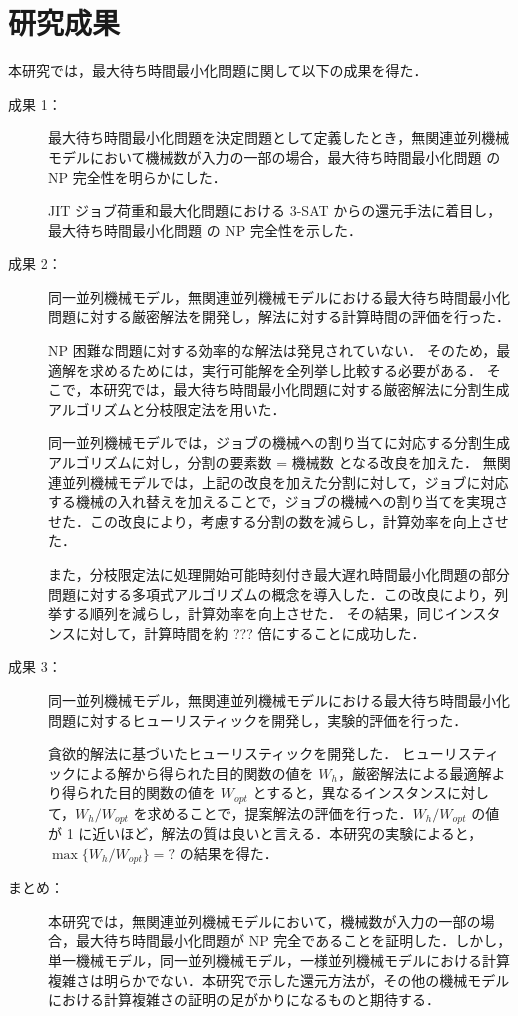 \documentclass[12pt]{optlab-bachelor}
\begin{document}
\section{研究成果}
本研究では，最大待ち時間最小化問題に関して以下の成果を得た．
\begin{description}
  \item[成果 1：]
  最大待ち時間最小化問題を決定問題として定義したとき，無関連並列機械モデルにおいて機械数が入力の一部の場合，最大待ち時間最小化問題 の NP 完全性を明らかにした．

  JIT ジョブ荷重和最大化問題における \textsc{3-SAT} からの還元手法に着目し，最大待ち時間最小化問題 の NP 完全性を示した．

  \item[成果 2：]
  同一並列機械モデル，無関連並列機械モデルにおける最大待ち時間最小化問題に対する厳密解法を開発し，解法に対する計算時間の評価を行った．

  NP 困難な問題に対する効率的な解法は発見されていない．
  そのため，最適解を求めるためには，実行可能解を全列挙し比較する必要がある．
  そこで，本研究では，最大待ち時間最小化問題に対する厳密解法に分割生成アルゴリズムと分枝限定法を用いた．

  同一並列機械モデルでは，ジョブの機械への割り当てに対応する分割生成アルゴリズムに対し，分割の要素数 = 機械数 となる改良を加えた．
  無関連並列機械モデルでは，上記の改良を加えた分割に対して，ジョブに対応する機械の入れ替えを加えることで，ジョブの機械への割り当てを実現させた．この改良により，考慮する分割の数を減らし，計算効率を向上させた．

  また，分枝限定法に処理開始可能時刻付き最大遅れ時間最小化問題の部分問題に対する多項式アルゴリズムの概念を導入した．この改良により，列挙する順列を減らし，計算効率を向上させた．
  その結果，同じインスタンスに対して，計算時間を約 ??? 倍にすることに成功した．

  \item[成果 3：]
  同一並列機械モデル，無関連並列機械モデルにおける最大待ち時間最小化問題に対するヒューリスティックを開発し，実験的評価を行った．

  貪欲的解法に基づいたヒューリスティックを開発した．
  ヒューリスティックによる解から得られた目的関数の値を $W_h$，厳密解法による最適解より得られた目的関数の値を $W_{opt}$ とすると，異なるインスタンスに対して，$W_h/W_{opt}$ を求めることで，提案解法の評価を行った．$W_h/W_{opt}$ の値が 1 に近いほど，解法の質は良いと言える．本研究の実験によると，$\max\big\{W_h/W_{opt}\big\} = ?$ の結果を得た．

  \item[まとめ：] 本研究では，無関連並列機械モデルにおいて，機械数が入力の一部の場合，最大待ち時間最小化問題が NP 完全であることを証明した．しかし，単一機械モデル，同一並列機械モデル，一様並列機械モデルにおける計算複雑さは明らかでない．本研究で示した還元方法が，その他の機械モデルにおける計算複雑さの証明の足がかりになるものと期待する．
\end{description}
\end{document}
